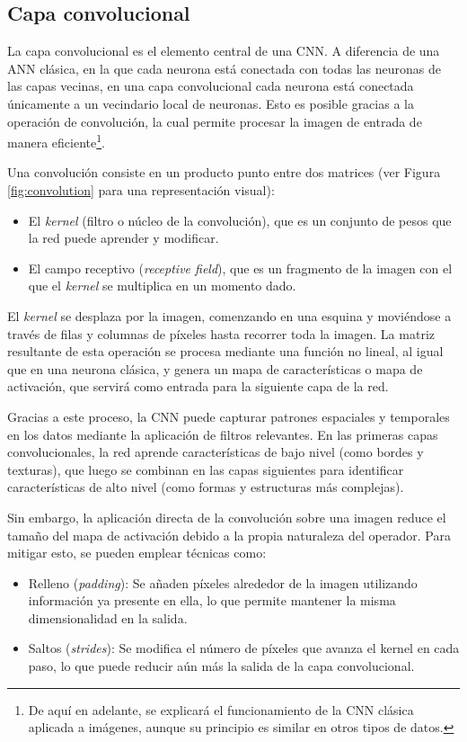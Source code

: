 \subsection{Capa convolucional}
La capa convolucional es el elemento central de una CNN. A diferencia de una ANN clásica, en la que cada neurona está conectada con todas las neuronas de las capas vecinas, en una capa convolucional cada neurona está conectada únicamente a un vecindario local de neuronas. Esto es posible gracias a la operación de convolución, la cual permite procesar la imagen de entrada de manera eficiente\footnote{De aquí en adelante, se explicará el funcionamiento de la CNN clásica aplicada a imágenes, aunque su principio es similar en otros tipos de datos.}.

Una convolución consiste en un producto punto entre dos matrices (ver Figura \ref{fig:convolution} para una representación visual):
\begin{itemize}
    \item El \textit{kernel} (filtro o núcleo de la convolución), que es un conjunto de pesos que la red puede aprender y modificar.
    \item El campo receptivo (\textit{receptive field}), que es un fragmento de la imagen con el que el \textit{kernel} se multiplica en un momento dado.
\end{itemize}

El \textit{kernel} se desplaza por la imagen, comenzando en una esquina y moviéndose a través de filas y columnas de píxeles hasta recorrer toda la imagen. La matriz resultante de esta operación se procesa mediante una función no lineal, al igual que en una neurona clásica, y genera un mapa de características o mapa de activación, que servirá como entrada para la siguiente capa de la red.

Gracias a este proceso, la CNN puede capturar patrones espaciales y temporales en los datos mediante la aplicación de filtros relevantes. En las primeras capas convolucionales, la red aprende características de bajo nivel (como bordes y texturas), que luego se combinan en las capas siguientes para identificar características de alto nivel (como formas y estructuras más complejas).

Sin embargo, la aplicación directa de la convolución sobre una imagen reduce el tamaño del mapa de activación debido a la propia naturaleza del operador. Para mitigar esto, se pueden emplear técnicas como:
\begin{itemize}
    \item Relleno (\textit{padding}): Se añaden píxeles alrededor de la imagen utilizando información ya presente en ella, lo que permite mantener la misma dimensionalidad en la salida.
    \item Saltos (\textit{strides}): Se modifica el número de píxeles que avanza el kernel en cada paso, lo que puede reducir aún más la salida de la capa convolucional.
\end{itemize}

